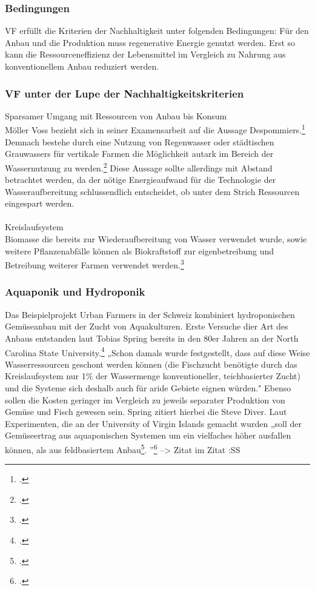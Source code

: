 \documentclass{scrartcl}
\begin{document}
\subsubsection{Bedingungen}
VF erfüllt die Kriterien der Nachhaltigkeit unter folgenden Bedingungen:
Für den Anbau und die Produktion muss regenerative Energie genutzt werden. Erst so kann die Ressourceneffizienz der Lebensmittel im Vergleich zu Nahrung aus konventionellem Anbau reduziert werden. 

\subsubsection{VF unter der Lupe der Nachhaltigkeitskriterien}

Sparsamer Umgang mit Ressourcen von Anbau bis Konsum\\
Möller Voss bezieht sich in seiner Examensarbeit auf die Aussage Despommiers.\footcite[S.9]{PeterMollerVoss2013VerticalRise} Demnach bestehe durch eine Nutzung von Regenwasser oder städtischen Grauwassers für vertikale Farmen die Möglichkeit autark im Bereich der Wassernutzung zu werden.\footcites[Vgl.]{Despommier2010TheCentury.} Diese Aussage sollte allerdings mit Abstand betrachtet werden, da der nötige Energieaufwand für die Technologie der Wasseraufbereitung schlussendlich entscheidet, ob unter dem Strich Ressourcen eingespart werden.\\
\\
Kreislaufsystem\\
Biomasse die bereits zur Wiederaufbereitung von Wasser verwendet wurde, sowie weitere Pflanzenabfälle können als Biokraftstoff zur eigenbetreibung und Betreibung weiterer Farmen verwendet werden.\footcites[Vgl.][S.80ff]{Despommier2009TheFarms}\\





\subsubsection{Aquaponik und Hydroponik}

Das Beispielprojekt Urban Farmers in der Schweiz kombiniert hydroponischen Gemüseanbau mit der Zucht von Aquakulturen. Erste Versuche dier Art des Anbaus entstanden laut Tobias Spring bereits in den 80er Jahren an der North Carolina State University.\footcite{Diver2006Aquaponics-IntegrationAquaculture} „Schon damals wurde festgestellt, dass auf diese Weise Wasserressourcen geschont werden können (die Fischzucht benötigte durch das Kreislaufsystem nur 1\% der Wassermenge konventioneller, teichbasierter Zucht) und die Systeme sich deshalb auch für aride Gebiete eignen würden." Ebenso sollen die Kosten geringer im Vergleich zu jeweils separater Produktion von Gemüse und Fisch gewesen sein. Spring zitiert hierbei die Steve Diver. Laut Experimenten, die an der University of Virgin Islands gemacht wurden „soll der Gemüseertrag aus aquaponischen Systemen um ein vielfaches höher ausfallen können, als aus feldbasiertem Anbau\footcite{Diver2006Aquaponics-IntegrationAquaculture}. ”\footcite[S.27]{TobiasSpringDerBasel-Stadt} --> Zitat im Zitat :SS
\end{document}
